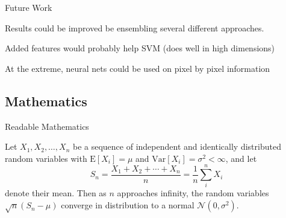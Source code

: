 \documentclass{beamer}
\begin{document}
\begin{frame}{Future Work}
\itemize
\item Results could be improved be ensembling several different approaches.
\item Added features would probably help SVM (does well in high dimensions)
\item At the extreme, neural nets could be used on pixel by pixel information
\end{frame}

\subsection{Mathematics}

\begin{frame}{Readable Mathematics}

Let $X_1, X_2, \ldots, X_n$ be a sequence of independent and identically distributed random variables with $\text{E}[X_i] = \mu$ and $\text{Var}[X_i] = \sigma^2 < \infty$, and let
$$S_n = \frac{X_1 + X_2 + \cdots + X_n}{n}
      = \frac{1}{n}\sum_{i}^{n} X_i$$
denote their mean. Then as $n$ approaches infinity, the random variables $\sqrt{n}(S_n - \mu)$ converge in distribution to a normal $\mathcal{N}(0, \sigma^2)$.

\end{frame}
\end{document}
